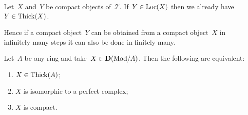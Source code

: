 \documentclass[10pt,a4paper]{article}
\begin{document}
\begin{proposition}
  Let~$X$ and~$Y$ be compact objects of~$\mathcal{T}$. If~$Y\in\operatorname{Loc}(X)$ then we already have~$Y\in\operatorname{Thick}(X)$.
\end{proposition}
Hence if a compact object~$Y$ can be obtained from a compact object~$X$ in infinitely many steps it can also be done in finitely many.
\begin{example}
  Let~$A$ be any ring and take~$X\in\mathbf{D}(\mathrm{Mod}/A)$. Then the following are equivalent:
  \begin{enumerate}
    \item $X\in\operatorname{Thick}(A)$;
    \item $X$ is isomorphic to a perfect complex;
    \item $X$ is compact.
  \end{enumerate}
\end{example}
\end{document}
